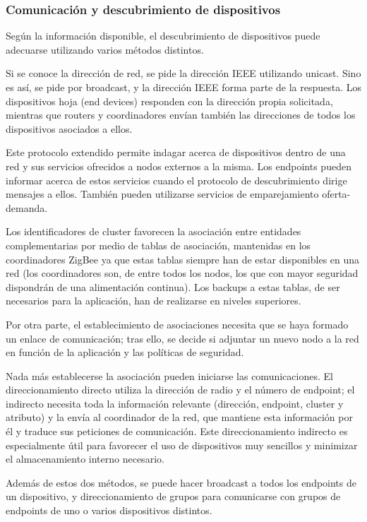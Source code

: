 \subsubsection{Comunicaci\'on y descubrimiento de dispositivos}
Seg\'un la informaci\'on disponible, el descubrimiento de dispositivos puede adecuarse utilizando varios m\'etodos distintos.

Si se conoce la direcci\'on de red, se pide la direcci\'on IEEE utilizando unicast. Sino es as\'i, se pide por broadcast, y la direcci\'on IEEE forma parte de la respuesta. Los dispositivos hoja (end devices) responden con la direcci\'on propia solicitada, mientras que routers y coordinadores env\'ian tambi\'en las direcciones de todos los dispositivos asociados a ellos.

Este protocolo extendido permite indagar acerca de dispositivos dentro de una red y sus servicios ofrecidos a nodos externos a la misma. Los endpoints pueden informar acerca de estos servicios cuando el protocolo de descubrimiento dirige mensajes a ellos. Tambi\'en pueden utilizarse servicios de emparejamiento oferta-demanda.

Los identificadores de cluster favorecen la asociaci\'on entre entidades complementarias por medio de tablas de asociaci\'on, mantenidas en los coordinadores ZigBee ya que estas tablas siempre han de estar disponibles en una red (los coordinadores son, de entre todos los nodos, los que con mayor seguridad dispondr\'an de una alimentaci\'on continua). Los backups a estas tablas, de ser necesarios para la aplicaci\'on, han de realizarse en niveles superiores.

Por otra parte, el establecimiento de asociaciones necesita que se haya formado un enlace de comunicaci\'on; tras ello, se decide si adjuntar un nuevo nodo a la red en funci\'on de la aplicaci\'on y las pol\'iticas de seguridad.

Nada m\'as establecerse la asociaci\'on pueden iniciarse las comunicaciones. El direccionamiento directo utiliza la direcci\'on de radio y el n\'umero de endpoint; el indirecto necesita toda la informaci\'on relevante (direcci\'on, endpoint, cluster y atributo) y  la env\'ia al coordinador de la red, que mantiene esta informaci\'on por \'el y traduce sus peticiones de comunicaci\'on. Este direccionamiento indirecto es especialmente \'util para favorecer el uso de dispositivos muy sencillos y minimizar el almacenamiento interno necesario. 

Adem\'as de estos dos m\'etodos, se puede hacer broadcast a todos los endpoints de un dispositivo, y direccionamiento de grupos para comunicarse con grupos de endpoints de uno o varios dispositivos distintos.


